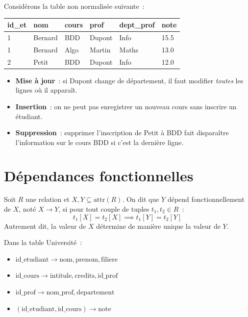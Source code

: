 \begin{exemple}
Consid\'erons la table non normalis\'ee suivante~:

\begin{center}
\begin{tabular}{llllll}
\toprule
\textbf{id\_et} & \textbf{nom} & \textbf{cours} & \textbf{prof} & \textbf{dept\_prof} & \textbf{note} \\
\midrule
1 & Bernard & BDD & Dupont & Info & 15.5 \\
1 & Bernard & Algo & Martin & Maths & 13.0 \\
2 & Petit & BDD & Dupont & Info & 12.0 \\
\bottomrule
\end{tabular}
\end{center}

\begin{itemize}
    \item \textbf{Mise \`a jour}~: si Dupont change de d\'epartement, il faut modifier
          \emph{toutes} les lignes o\`u il appara\^it.
    \item \textbf{Insertion}~: on ne peut pas enregistrer un nouveau cours sans
          inscrire un \'etudiant.
    \item \textbf{Suppression}~: supprimer l'inscription de Petit \`a BDD fait
          dispara\^itre l'information sur le cours BDD si c'est la derni\`ere ligne.
\end{itemize}
\end{exemple}

\section{D\'ependances fonctionnelles}

\begin{definition}
Soit $R$ une relation et $X, Y \subseteq \text{attr}(R)$. On dit que $Y$
d\'epend fonctionnellement de $X$, not\'e $X \to Y$, si pour tout couple
de tuples $t_1, t_2 \in R$~:
\[
t_1[X] = t_2[X] \implies t_1[Y] = t_2[Y]
\]
Autrement dit, la valeur de $X$ d\'etermine de mani\`ere unique la valeur de $Y$.
\end{definition}

\begin{exemple}
Dans la table Universit\'e~:
\begin{itemize}
    \item $\text{id\_etudiant} \to \text{nom}, \text{prenom}, \text{filiere}$
    \item $\text{id\_cours} \to \text{intitule}, \text{credits}, \text{id\_prof}$
    \item $\text{id\_prof} \to \text{nom\_prof}, \text{departement}$
    \item $(\text{id\_etudiant}, \text{id\_cours}) \to \text{note}$
\end{itemize}
\end{exemple}

